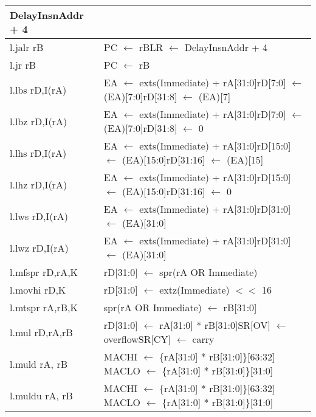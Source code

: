 \begin{longtable}{|p{3cm}|p{10cm}|}
DelayInsnAddr + 4 \\ \hline l.jalr rB & PC $\leftarrow$ rB\newline LR $\leftarrow$ DelayInsnAddr + 4 \\ \hline l.jr rB & PC $\leftarrow$ rB \\ \hline l.lbs rD,I(rA) & EA $\leftarrow$ exts(Immediate) + rA[31:0]\newline rD[7:0] $\leftarrow$ (EA)[7:0]\newline rD[31:8] $\leftarrow$ (EA)[7] \\ \hline l.lbz rD,I(rA) & EA $\leftarrow$ exts(Immediate) + rA[31:0]\newline rD[7:0] $\leftarrow$ (EA)[7:0]\newline rD[31:8] $\leftarrow$ 0 \\ \hline l.lhs rD,I(rA) & EA $\leftarrow$ exts(Immediate) + rA[31:0]\newline rD[15:0] $\leftarrow$ (EA)[15:0]\newline rD[31:16] $\leftarrow$ (EA)[15] \\ \hline l.lhz rD,I(rA) & EA $\leftarrow$ exts(Immediate) + rA[31:0]\newline rD[15:0] $\leftarrow$ (EA)[15:0]\newline rD[31:16] $\leftarrow$ 0 \\ \hline l.lws rD,I(rA) & EA $\leftarrow$ exts(Immediate) + rA[31:0]\newline rD[31:0] $\leftarrow$ (EA)[31:0] \\ \hline l.lwz rD,I(rA) & EA $\leftarrow$ exts(Immediate) + rA[31:0]\newline rD[31:0] $\leftarrow$ (EA)[31:0] \\ \hline l.mfspr rD,rA,K & rD[31:0] $\leftarrow$ spr(rA OR Immediate) \\ \hline l.movhi rD,K & rD[31:0] $\leftarrow$ extz(Immediate) $<<$ 16 \\ \hline l.mtspr rA,rB,K & spr(rA OR Immediate) $\leftarrow$ rB[31:0] \\ \hline l.mul rD,rA,rB & rD[31:0] $\leftarrow$ rA[31:0] * rB[31:0]\newline SR[OV] $\leftarrow$ overflow\newline SR[CY] $\leftarrow$ carry \\ \hline
l.muld rA, rB & MACHI $\leftarrow$ \{rA[31:0] * rB[31:0]\}[63:32] \newline MACLO $\leftarrow$ \{rA[31:0] * rB[31:0]\}[31:0]\\ \hline
l.muldu rA, rB & MACHI $\leftarrow$ \{rA[31:0] * rB[31:0]\}[63:32] \newline MACLO $\leftarrow$ \{rA[31:0] * rB[31:0]\}[31:0]\\ \hline

\end{longtable}
